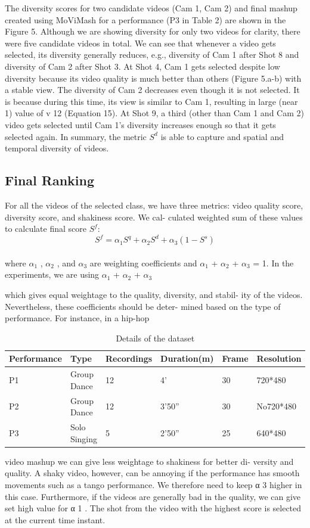 \documentclass[conference]{IEEEtran}
\begin{document}
The diversity scores for two candidate videos (Cam 1, Cam 2)
and final mashup created using MoViMash for a performance (P3
in Table 2) are shown in the Figure 5. Although we are showing
diversity for only two videos for clarity, there were five candidate
videos in total. We can see that whenever a video gets selected,
its diversity generally reduces, e.g., diversity of Cam 1 after Shot 8
and diversity of Cam 2 after Shot 3. At Shot 4, Cam 1 gets selected
despite low diversity because its video quality is much better than
others (Figure 5.a-b) with a stable view. The diversity of Cam 2
decreases even though it is not selected. It is because during this
time, its view is similar to Cam 1, resulting in large (near 1) value
of v 12 (Equation 15). At Shot 9, a third (other than Cam 1 and Cam
2) video gets selected until Cam 1’s diversity increases enough so
that it gets selected again. In summary, the metric ${S^{d}}$ is able to
capture and spatial and temporal diversity of videos.

\subsection{Final Ranking}

For all the videos of the selected class, we have three metrics:
video quality score, diversity score, and shakiness score. We cal-
culated weighted sum of these values to calculate final score ${S^{f}}$:
\begin{equation}
S^f = \alpha_1 S^q + \alpha_2 S^d + \alpha_3 (1-S^s)
\end{equation}
\\
where $\alpha_1$ , $\alpha_2$ , and $\alpha_3$ are weighting coefficients and $\alpha_1$ + $\alpha_2$ +
$\alpha_3$ = 1. In the experiments, we are using $\alpha_1$ + $\alpha_2$ +
$\alpha_3$

which gives equal weightage to the quality, diversity, and stabil-
ity of the videos. Nevertheless, these coefficients should be deter-
mined based on the type of performance. For instance, in a hip-hop
\begin{table}
\centering
\small
\caption{Details of the dataset}
\begin{tabular}{p{1.5cm}|p{1cm}|p{1.5cm}|p{1cm}|p{1cm}|p{1cm}} \hline
Performance&Type&Recordings&Duration(m)&Frame&Resolution\\ \hline
P1 &Group Dance&12&4'&30&720*480\\ \hline
P2&Group Dance&12&3'50''&30&No720*480\\ \hline
P3&Solo Singing&5&2'50''&25&640*480\\ \hline
\end{tabular}
\end{table}
video mashup we can give less weightage to shakiness for better di-
versity and quality. A shaky video, however, can be annoying if the
performance has smooth movements such as a tango performance.
We therefore need to keep α 3 higher in this case. Furthermore, if
the videos are generally bad in the quality, we can give set high
value for α 1 . The shot from the video with the highest score is
selected at the current time instant.
\end{document}
